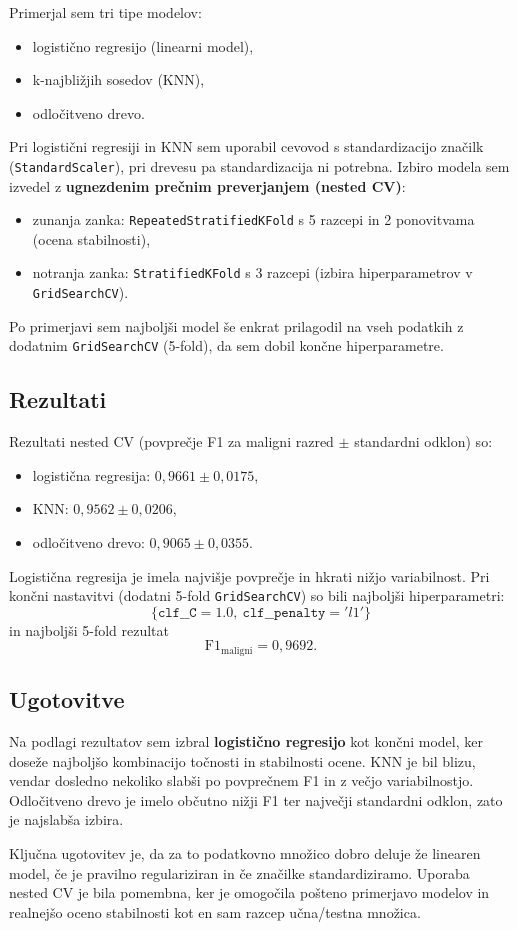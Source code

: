\documentclass[12pt,a4paper]{article}
\begin{document}
Primerjal sem tri tipe modelov:
\begin{itemize}
    \item logistično regresijo (linearni model),
    \item k-najbližjih sosedov (KNN),
    \item odločitveno drevo.
\end{itemize}

Pri logistični regresiji in KNN sem uporabil cevovod s standardizacijo značilk (\texttt{StandardScaler}), pri drevesu pa standardizacija ni potrebna. Izbiro modela sem izvedel z \textbf{ugnezdenim prečnim preverjanjem (nested CV)}:
\begin{itemize}
    \item zunanja zanka: \texttt{RepeatedStratifiedKFold} s 5 razcepi in 2 ponovitvama (ocena stabilnosti),
    \item notranja zanka: \texttt{StratifiedKFold} s 3 razcepi (izbira hiperparametrov v \texttt{GridSearchCV}).
\end{itemize}

Po primerjavi sem najboljši model še enkrat prilagodil na vseh podatkih z dodatnim \texttt{GridSearchCV} (5-fold), da sem dobil končne hiperparametre.

\subsection{Rezultati}
Rezultati nested CV (povprečje F1 za maligni razred $\pm$ standardni odklon) so:
\begin{itemize}
    \item logistična regresija: $0{,}9661 \pm 0{,}0175$,
    \item KNN: $0{,}9562 \pm 0{,}0206$,
    \item odločitveno drevo: $0{,}9065 \pm 0{,}0355$.
\end{itemize}

Logistična regresija je imela najvišje povprečje in hkrati nižjo variabilnost. Pri končni nastavitvi (dodatni 5-fold \texttt{GridSearchCV}) so bili najboljši hiperparametri:
\[
\{\texttt{clf\_\_C}=1.0,\ \texttt{clf\_\_penalty}='l1'\}
\]
in najboljši 5-fold rezultat
\[
\text{F1}_{\text{maligni}} = 0{,}9692.
\]

\subsection{Ugotovitve}
Na podlagi rezultatov sem izbral \textbf{logistično regresijo} kot končni model, ker doseže najboljšo kombinacijo točnosti in stabilnosti ocene. KNN je bil blizu, vendar dosledno nekoliko slabši po povprečnem F1 in z večjo variabilnostjo. Odločitveno drevo je imelo občutno nižji F1 ter največji standardni odklon, zato je najslabša izbira.

Ključna ugotovitev je, da za to podatkovno množico dobro deluje že linearen model, če je pravilno regulariziran in če značilke standardiziramo. Uporaba nested CV je bila pomembna, ker je omogočila pošteno primerjavo modelov in realnejšo oceno stabilnosti kot en sam razcep učna/testna množica.
\end{document}
